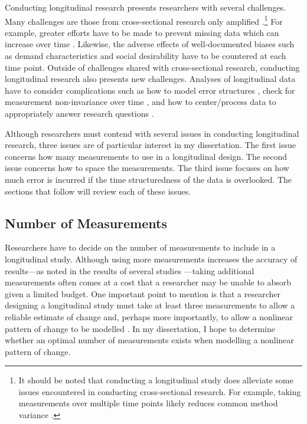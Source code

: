 \documentclass[
12pt, %
twoside,
english]{guelphthesis}
\begin{document}
Conducting longitudinal research presents researchers with several challenges. Many challenges are those from cross-sectional research only amplified \autocite[for a review, see][]{bergman1993}.\footnote{It should be noted that conducting a longitudinal study does alleviate some issues encountered in conducting cross-sectional research. For example, taking measurements over multiple time points likely reduces common method variance \parencites{podsakoff2003}[for an example, see ][]{ostroff2002}.} For example, greater efforts have to be made to prevent missing data which can increase over time \autocite{newman2008,dillman2014}. Likewise, the adverse effects of well-documented biases such as demand characteristics \autocite{orne1962} and social desirability \autocite{nederhof1985} have to be countered at each time point. Outside of challenges shared with cross-sectional research, conducting longitudinal research also presents new challenges. Analyses of longitudinal data have to consider complications such as how to model error structures \autocite{grimm2010a}, check for measurement non-invariance over time \autocite[the extent to which a construct is measured with the same measurement model over time;][]{mellenbergh1989}, and how to center/process data to appropriately answer research questions \autocite{enders2007,wang2015}.

Although researchers must contend with several issues in conducting longitudinal research, three issues are of particular interest in my dissertation. The first issue concerns how many measurements to use in a longitudinal design. The second issue concerns how to space the measurements. The third issue focuses on how much error is incurred if the time structuredness of the data is overlooked. The sections that follow will review each of these issues.

\hypertarget{number-of-measurements}{%
\subsection{Number of Measurements}\label{number-of-measurements}}

Researchers have to decide on the number of measurements to include in a longitudinal study. Although using more measurements increases the accuracy of results---as noted in the results of several studies \autocites[e.g.,][]{coulombe2016,timmons2015,finch2017,fine2019}---taking additional measurements often comes at a cost that a researcher may be unable to absorb given a limited budget. One important point to mention is that a researcher designing a longitudinal study must take at least three measurements to allow a reliable estimate of change and, perhaps more importantly, to allow a nonlinear pattern of change to be modelled \autocite{ployhart2010}. In my dissertation, I hope to determine whether an optimal number of measurements exists when modelling a nonlinear pattern of change.
\end{document}
